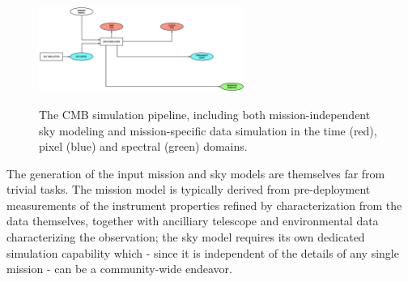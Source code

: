 \begin{figure}[htbp]
\includegraphics[width=0.6\textwidth]{Analysis/sim}\\
\caption{The CMB simulation pipeline, including both mission-independent sky modeling and mission-specific data simulation in the time (red), pixel (blue) and spectral (green) domains.}
\label{fig_sim}
\end{figure}

The generation of the input mission and sky models are themselves far from trivial tasks. The mission model is typically derived from pre-deployment measurements of the instrument properties refined by characterization from the data themselves, together with ancilliary telescope and environmental data characterizing the observation; the sky model requires its own dedicated simulation capability which - since it is independent of the details of any single mission - can be a community-wide endeavor.









%



